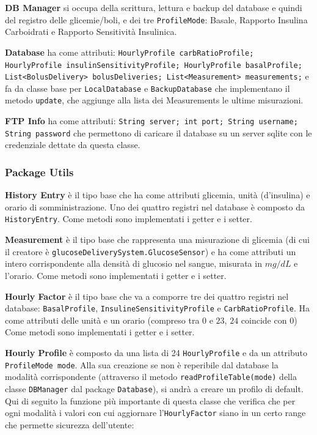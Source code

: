 \documentclass[twocolumn]{article}
\begin{document}
\noindent\textbf{DB Manager}
\newline si occupa della scrittura, lettura e backup del database e quindi del registro delle glicemie/boli, e dei tre \texttt{ProfileMode}: Basale, Rapporto Insulina Carboidrati e Rapporto Sensitività Insulinica.

\noindent\textbf{Database}
\newline ha come attributi: \texttt{HourlyProfile carbRatioProfile; HourlyProfile insulinSensitivityProfile; HourlyProfile basalProfile; List<BolusDelivery> bolusDeliveries; List<Measurement> measurements;} e fa da classe base per \texttt{LocalDatabase} e \texttt{BackupDatabase} che implementano il metodo \texttt{update}, che aggiunge alla lista dei Measurements le ultime misurazioni.

\noindent\textbf{FTP Info}
\newline ha come attributi: \texttt{String server; int port; String username; String password} che permettono di caricare il database su un server sqlite con le credenziale dettate da questa classe.


\subsubsection{Package Utils}

\noindent\textbf{History Entry}
\newline è il tipo base che ha come attributi glicemia, unità (d'insulina) e orario di somministrazione. Uno dei quattro registri nel database è composto da \texttt{HistoryEntry}. Come metodi sono implementati i getter e i setter.

\noindent\textbf{Measurement}
\newline è il tipo base che rappresenta una misurazione di glicemia (di cui il creatore è \texttt{glucoseDeliverySystem.GlucoseSensor}) e ha come attributi un intero corrispondente alla densità di glucosio nel sangue, misurata in $mg/dL$ e l'orario. Come metodi sono implementati i getter e i setter.

\noindent\textbf{Hourly Factor}
\newline è il tipo base che va a comporre tre dei quattro registri nel database: \texttt{BasalProfile}, \texttt{InsulineSensitivityProfile} e \texttt{CarbRatioProfile}. Ha come attributi delle unità e un orario (compreso tra $0$ e $23$, $24$ coincide con $0$) Come metodi sono implementati i getter e i setter.

\noindent\textbf{Hourly Profile}
\newline è composto da una lista di 24 \texttt{HourlyProfile} e da un attributo \texttt{ProfileMode mode}. Alla sua creazione se non è reperibile dal database la modalità corrispondente (attraverso il metodo \texttt{readProfileTable(mode)} della classe \texttt{DBManager} dal package \texttt{Database}), si andrà a creare un profilo di default. Qui di seguito la funzione più importante di questa classe che verifica che per ogni modalità i valori con cui aggiornare l'\texttt{HourlyFactor} siano in un certo range che permette sicurezza dell'utente:
\end{document}
